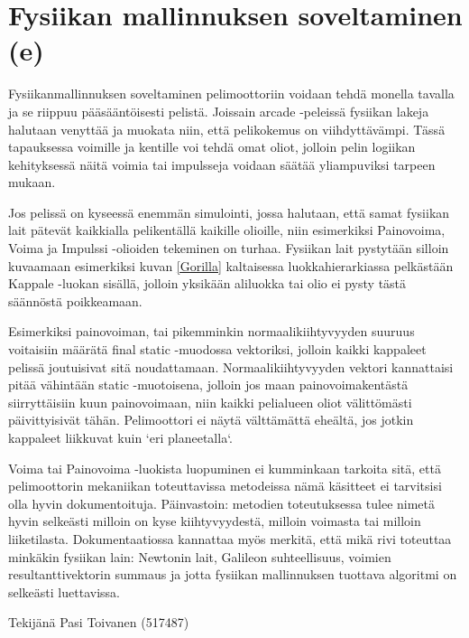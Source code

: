 \section{Fysiikan mallinnuksen soveltaminen (e)}

\label{Fysiikan mallinnuksen soveltaminen (e)}

Fysiikanmallinnuksen soveltaminen pelimoottoriin voidaan tehdä monella tavalla
ja se riippuu pääsääntöisesti pelistä. Joissain arcade -peleissä fysiikan lakeja
halutaan venyttää ja muokata niin, että pelikokemus on viihdyttävämpi. Tässä
tapauksessa voimille ja kentille voi tehdä omat oliot, jolloin pelin logiikan
kehityksessä näitä voimia tai impulsseja voidaan säätää yliampuviksi tarpeen
mukaan.

Jos pelissä on kyseessä enemmän simulointi, jossa halutaan, että samat fysiikan
lait pätevät kaikkialla pelikentällä kaikille olioille, niin esimerkiksi
Painovoima, Voima ja Impulssi -olioiden tekeminen on turhaa. Fysiikan lait
pystytään silloin kuvaamaan esimerkiksi kuvan \ref{Gorilla} kaltaisessa
luokkahierarkiassa pelkästään Kappale -luokan sisällä, jolloin yksikään
aliluokka tai olio ei pysty tästä säännöstä poikkeamaan.

Esimerkiksi painovoiman, tai pikemminkin normaalikiihtyvyyden suuruus voitaisiin
määrätä final static -muodossa vektoriksi, jolloin kaikki kappaleet pelissä
joutuisivat sitä noudattamaan. Normaalikiihtyvyyden vektori kannattaisi pitää
vähintään static -muotoisena, jolloin jos maan painovoimakentästä siirryttäisiin
kuun painovoimaan, niin kaikki pelialueen oliot välittömästi päivittyisivät
tähän. Pelimoottori ei näytä välttämättä eheältä, jos jotkin kappaleet liikkuvat
kuin `eri planeetalla`.

Voima tai Painovoima -luokista luopuminen ei kumminkaan tarkoita sitä, että
pelimoottorin mekaniikan toteuttavissa metodeissa nämä käsitteet ei tarvitsisi
olla hyvin dokumentoituja. Päinvastoin: metodien toteutuksessa tulee nimetä
hyvin selkeästi milloin on kyse kiihtyvyydestä, milloin voimasta tai milloin
liiketilasta. Dokumentaatiossa kannattaa myös merkitä, että mikä rivi toteuttaa
minkäkin fysiikan lain: Newtonin lait, Galileon suhteellisuus, voimien
resultanttivektorin summaus ja jotta fysiikan mallinnuksen tuottava algoritmi on
selkeästi luettavissa.

Tekijänä Pasi Toivanen (517487)
